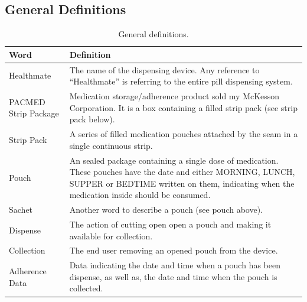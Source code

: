 \documentclass[12pt]{article}
\begin{document}
\subsection{General Definitions}
\begin{table}[htb!]
\begin{center} \begin{adjustbox}{max width=\textwidth}\small
\begin{tabular}{|p{}|p{}|}
 \hline
 \textbf{Word} & \textbf{Definition}\\
 \hline 
 Healthmate & The name of the dispensing device. Any reference to ``Healthmate'' is referring to the entire pill dispensing system.   \\ \hline
 PACMED Strip Package & Medication storage/adherence product sold my McKesson Corporation. It is a box containing a filled strip pack (see strip pack below). \\ \hline
 Strip Pack & A series of filled medication pouches attached by the seam in a single continuous strip. \\ \hline
 Pouch & An sealed package containing a single dose of medication. These pouches have the date and either MORNING, LUNCH, SUPPER or BEDTIME written on them, indicating when the medication inside should be consumed. \\ \hline
 Sachet &  Another word to describe a pouch (see pouch above). \\ \hline
 Dispense &  The action of cutting open open a pouch and making it available for collection. \\ \hline
 Collection & The end user removing an opened pouch from the device. \\ \hline
 Adherence Data & Data indicating the date and time when a pouch has been dispense, as well as, the date and time when the pouch is collected. \\ \hline
\end{tabular}\end{adjustbox}\end{center}\caption{General definitions.}
\end{table}
\end{document}
